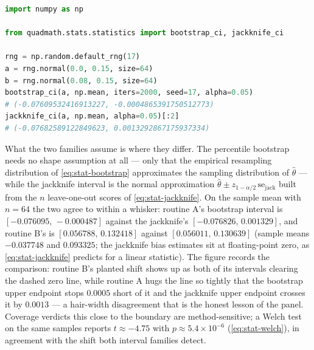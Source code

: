 \documentclass[
  10pt,
]{article}
\begin{document}
\begin{lstlisting}[language=Python]
import numpy as np

from quadmath.stats.statistics import bootstrap_ci, jackknife_ci

rng = np.random.default_rng(17)
a = rng.normal(0.0, 0.15, size=64)
b = rng.normal(0.08, 0.15, size=64)
bootstrap_ci(a, np.mean, iters=2000, seed=17, alpha=0.05)
# (-0.07609532416913227, -0.0004865391750512773)
jackknife_ci(a, np.mean, alpha=0.05)[:2]
# (-0.07682589122849623, 0.0013292867175937334)
\end{lstlisting}

What the two families assume is where they differ. The percentile
bootstrap needs no shape assumption at all --- only that the empirical
resampling distribution of \eqref{eq:stat-bootstrap} approximates the
sampling distribution of \(\hat{\theta}\) --- while the jackknife
interval is the normal approximation \(\hat{\theta} \pm
z_{1-\alpha/2}\,\mathrm{se}_{\text{jack}}\) built from the \(n\)
leave-one-out scores of \eqref{eq:stat-jackknife}. On the sample mean
with \(n = 64\) the two agree to within a whisker: routine A's bootstrap
interval is \([-0.076095,\,-0.000487]\) against the jackknife's
\([-0.076826,\,0.001329]\), and routine B's is \([0.056788,\,0.132418]\)
against \([0.056011,\,0.130639]\) (sample means \(-0.037748\) and
\(0.093325\); the jackknife bias estimates sit at floating-point zero,
as \eqref{eq:stat-jackknife} predicts for a linear statistic). The
figure records the comparison: routine B's planted shift shows up as
both of its intervals clearing the dashed zero line, while routine A
hugs the line so tightly that the bootstrap upper endpoint stops
\(0.0005\) short of it and the jackknife upper endpoint crosses it by
\(0.0013\) --- a hair-width disagreement that is the honest lesson of
the panel. Coverage verdicts this close to the boundary are
method-sensitive; a Welch test on the same samples reports
\(t \approx -4.75\) with \(p \approx 5.4 \times 10^{-6}\)
(\eqref{eq:stat-welch}), in agreement with the shift both interval
families detect.
\end{document}
